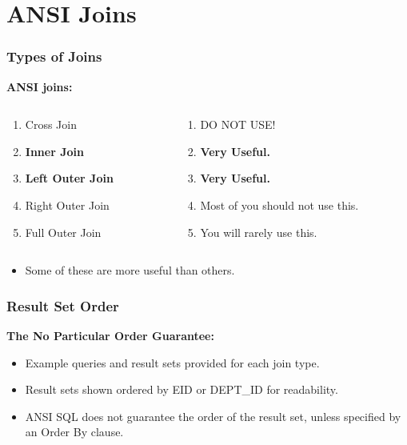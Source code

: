 \documentclass{beamer}
\begin{document}
\section{ANSI  Joins} %

\begin{frame} %
  \frametitle{Types of Joins}

  \textbf{ANSI joins:}

  \smallskip

  \begin{columns}

    \begin{column}{.5\textwidth}
      \begin{enumerate}
      \item {\color{red}Cross Join}
      \item \textbf{Inner Join}
      \item \textbf{Left Outer Join}
      \item Right Outer Join
      \item Full Outer Join
      \end{enumerate}
    \end{column}
    
    \begin{column}{.5\textwidth}
      \begin{enumerate}
      \item {\color{red}DO NOT USE\@!}
      \item \textbf{Very Useful.}
      \item \textbf{Very Useful.}
      \item Most of you should not use this.
      \item You will rarely use this.
      \end{enumerate}
    \end{column}

  \end{columns}

  \bigskip
  \bigskip
  \bigskip
  \begin{itemize}
  \item Some of these are more useful than others.
  \end{itemize}
  

\end{frame}  

\begin{frame}
  \frametitle{Result Set Order}
  
  \textbf{The No Particular Order Guarantee:}

  \begin{itemize}
  \item Example queries and result sets provided for each join type.
  \item Result sets shown ordered by EID or DEPT\_ID for readability.
  \item ANSI SQL does not guarantee the order of the result set,
    unless specified by an Order By clause.
  \end{itemize}

\end{frame}
\end{document}
